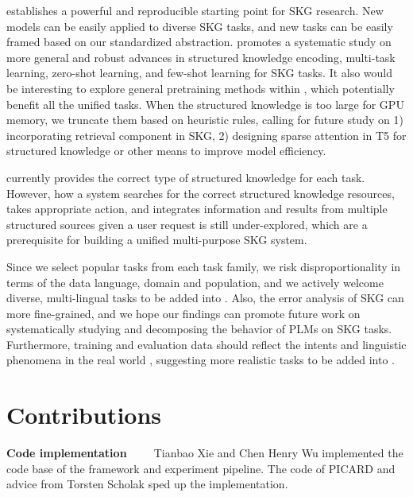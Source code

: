 \documentclass[11pt]{article}
\newcommand{\skg}{SKG\xspace}
\begin{document}
\uskg establishes a powerful and reproducible starting point for \skg research. New models can be easily applied to diverse \skg tasks, and new tasks can be easily framed based on our standardized abstraction.
\uskg promotes a systematic study on more general and robust advances in structured knowledge encoding, multi-task learning, zero-shot learning, and few-shot learning for \skg tasks.
It also would be interesting to explore general pretraining methods within \uskg, which potentially benefit all the unified tasks. 
When the structured knowledge is too large for GPU memory, we truncate them based on heuristic rules,
calling for future study on 1) incorporating retrieval component in \skg, 
2) designing sparse attention in T5 for structured knowledge or other means to improve model efficiency. 

\uskg currently provides the correct type of structured knowledge for each task. 
However, how a system searches for the correct structured knowledge resources, takes appropriate action, and integrates information and results from multiple structured sources given a user request is still under-explored, which are a prerequisite for building a unified multi-purpose \skg system. 

Since we select popular tasks from each task family, we risk disproportionality in terms of the data language,  domain and population, and we actively welcome diverse, multi-lingual tasks to be added into \uskg. 
Also, the error analysis of \skg can more fine-grained, and we hope our findings can promote future work on systematically studying and decomposing the behavior of PLMs on \skg tasks. 
Furthermore, training and evaluation data should reflect the intents and linguistic phenomena in the real world \cite{Vries2020TowardsEV}, suggesting more realistic tasks to be added into \uskg.  
\clearpage



\clearpage

\appendix

\section{Contributions}
\label{sec:contributions}


\noindent\textbf{Code implementation \ \ \ } Tianbao Xie and Chen Henry Wu implemented the code base of the \uskg framework and experiment pipeline. 
The code of PICARD and advice from Torsten Scholak sped up the implementation. 
\end{document}
